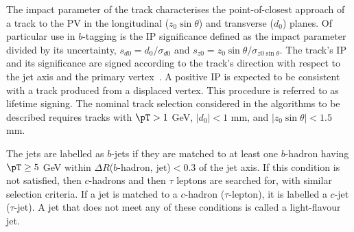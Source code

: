 The impact parameter of the track characterises the point-of-closest approach of a track to the PV in the longitudinal ($z_0\sin \theta$) and transverse ($d_0$) planes. 
Of particular use in $b$-tagging is the IP significance defined as the impact parameter divided by its uncertainty, $s_{d0} = d_0 / \sigma_{d0}$ and $s_{z0} = z_0 \sin \theta / \sigma_{z0 \sin \theta}$. 
The track's IP and its significance are signed according to the track's direction with respect to the jet axis and the primary vertex~\cite{PERF-2012-04}. A positive IP is expected to be consistent with a track produced from a displaced vertex. 
This procedure is referred to as lifetime signing.
The nominal track selection considered in the algorithms to be described requires tracks with $\pT  > 1$ GeV,  $|d_0| < 1$ mm, and  $|z_0 \sin \theta | < 1.5$ mm.

The jets are labelled as $b$-jets if they are matched to at least one $b$-hadron having $\pT \geq 5$ GeV within $\Delta R$($b$-hadron, jet)$< 0.3$ of the jet axis. 
If this condition is not satisfied, then $c$-hadrons and then $\tau$ leptons are searched for, with similar selection criteria.
If a jet is matched to a $c$-hadron ($\tau$-lepton), it is labelled a $c$-jet ($\tau$-jet).
A jet that does not meet any of these conditions is called a light-flavour jet.%



